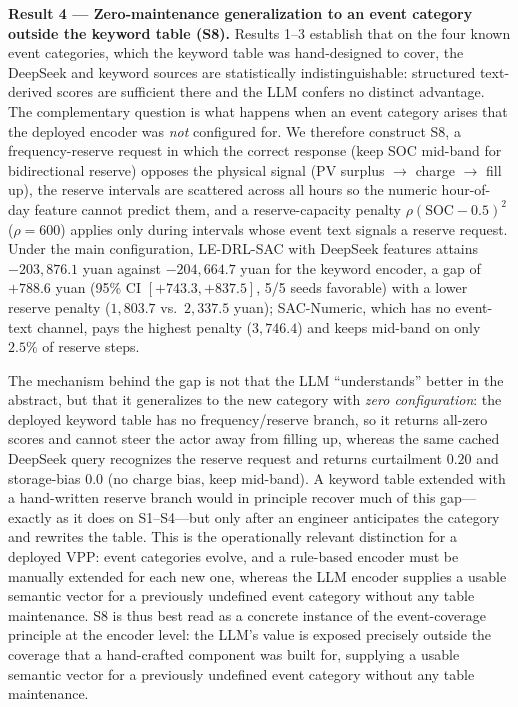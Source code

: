 \documentclass{ieeeaccess}
\begin{document}
\textbf{Result 4 --- Zero-maintenance generalization to an event category outside the keyword table (S8).} Results 1--3 establish that on the four known event categories, which the keyword table was hand-designed to cover, the DeepSeek and keyword sources are statistically indistinguishable: structured text-derived scores are sufficient there and the LLM confers no distinct advantage. The complementary question is what happens when an event category arises that the deployed encoder was \emph{not} configured for. We therefore construct S8, a frequency-reserve request in which the correct response (keep SOC mid-band for bidirectional reserve) opposes the physical signal (PV surplus $\to$ charge $\to$ fill up), the reserve intervals are scattered across all hours so the numeric hour-of-day feature cannot predict them, and a reserve-capacity penalty $\rho(\mathrm{SOC}-0.5)^2$ ($\rho=600$) applies only during intervals whose event text signals a reserve request. Under the main configuration, LE-DRL-SAC with DeepSeek features attains $-203{,}876.1$ yuan against $-204{,}664.7$ yuan for the keyword encoder, a gap of $+788.6$ yuan (95\% CI $[+743.3, +837.5]$, 5/5 seeds favorable) with a lower reserve penalty ($1{,}803.7$ vs.\ $2{,}337.5$ yuan); SAC-Numeric, which has no event-text channel, pays the highest penalty ($3{,}746.4$) and keeps mid-band on only $2.5\%$ of reserve steps.

The mechanism behind the gap is not that the LLM ``understands'' better in the abstract, but that it generalizes to the new category with \emph{zero configuration}: the deployed keyword table has no frequency/reserve branch, so it returns all-zero scores and cannot steer the actor away from filling up, whereas the same cached DeepSeek query recognizes the reserve request and returns curtailment $0.20$ and storage-bias $0.0$ (no charge bias, keep mid-band). A keyword table extended with a hand-written reserve branch would in principle recover much of this gap---exactly as it does on S1--S4---but only after an engineer anticipates the category and rewrites the table. This is the operationally relevant distinction for a deployed VPP: event categories evolve, and a rule-based encoder must be manually extended for each new one, whereas the LLM encoder supplies a usable semantic vector for a previously undefined event category without any table maintenance. S8 is thus best read as a concrete instance of the event-coverage principle at the encoder level: the LLM's value is exposed precisely outside the coverage that a hand-crafted component was built for, supplying a usable semantic vector for a previously undefined event category without any table maintenance.
\end{document}
